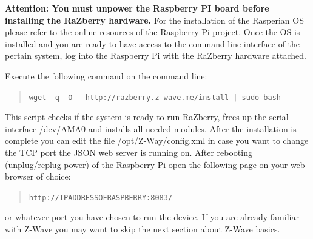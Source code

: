 \documentclass[10pt]{article}
\begin{document}
{\bf Attention: You must unpower the Raspberry PI board before installing the RaZberry hardware.}
For the installation of the Rasperian OS please refer to the online resources of the Raspberry Pi project. Once the OS is
installed and you are ready to have access to the command line interface of the pertain system, log into the Raspberry Pi with 
the RaZberry hardware attached.

Execute the following command on the command line:
\begin{quote}
{\tt wget -q -O - http://razberry.z-wave.me/install | sudo bash}
\end{quote} 

This script checks if the system is ready to run RaZberry, frees up the serial interface /dev/AMA0 and installs all needed modules. 
After the installation  is complete you can edit the file /opt/Z-Way/config.xml in case you want to change the TCP port the JSON 
web server is running on. After rebooting (unplug/replug power) of the Raspberry Pi open the following page on your web 
browser of choice:
\begin{quote}
{\tt http://IPADDRESSOFRASPBERRY:8083/ }
\end{quote}
or whatever port you have chosen to run the device. If you are already familiar with 
Z-Wave you may want to skip the next section about Z-Wave basics.

 
\end{document}
